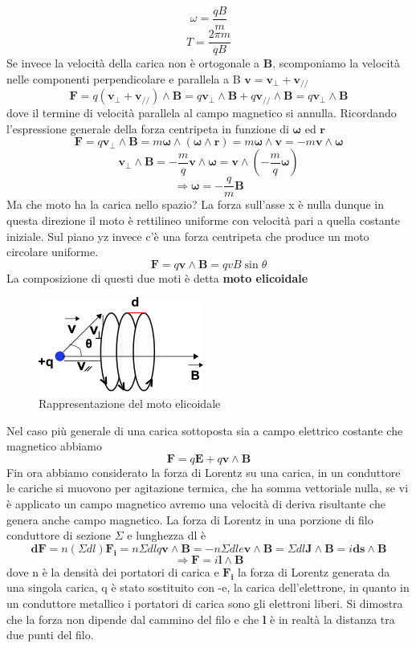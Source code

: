 \documentclass[10pt,a4paper]{article}
\begin{document}
\[\omega=\frac{qB}{m}\]
\[T=\frac{2\pi m }{qB}\]
Se invece la velocità della carica non è ortogonale a $\mathbf{B}$, scomponiamo la velocità nelle componenti perpendicolare e parallela a B \(\mathbf{v}=\mathbf{v_{\perp}}+\mathbf{v_{//}}\)
\[\mathbf{F} = q(\mathbf{v_{\perp}}+\mathbf{v_{//}})\wedge \mathbf{B}=q\mathbf{v_{\perp}}\wedge \mathbf{B}+q\mathbf{v_{//}}\wedge \mathbf{B}= q\mathbf{v_{\perp}}\wedge \mathbf{B} \] 
dove il termine di velocità parallela al campo magnetico si annulla. Ricordando l'espressione generale della forza centripeta in funzione di $\mathbf{\omega}$ ed $\mathbf{r}$
\[\mathbf{F}= q\mathbf{v_{\perp}}\wedge \mathbf{B}= m \mathbf{\omega}\wedge(\mathbf{\omega}\wedge\mathbf{r})= m\mathbf{\omega}\wedge\mathbf{v}= -m\mathbf{v}\wedge\mathbf{\omega} \] 
\[\mathbf{v_{\perp}}\wedge \mathbf{B}= -\frac{m}{q}\mathbf{v}\wedge\mathbf{\omega} =\mathbf{v}\wedge\left(-\frac{m}{q}\mathbf{\omega}\right) \]
\[\Rightarrow \mathbf{\omega}= -\frac{q}{m}\mathbf{B}\]
Ma che moto ha la carica nello spazio? La forza sull'asse x è nulla dunque in questa direzione il moto è rettilineo uniforme con velocità pari a quella costante iniziale. Sul piano yz invece c'è una forza centripeta che produce un moto circolare uniforme.
\[\mathbf{F}= q\mathbf{v}\wedge\mathbf{B}= qvB\sin\theta\]
La composizione di questi due moti è detta \textbf{moto elicoidale}
\begin{figure}[h!]
	\centering
	\includegraphics[width=0.5\linewidth]{images/moto_elicoidale}
	\caption{Rappresentazione del moto elicoidale}
	\label{fig:motoelicoidale}
\end{figure}
\FloatBarrier
Nel caso più generale di una carica sottoposta sia a campo elettrico costante che magnetico abbiamo
\[\mathbf{F}= q\mathbf{E}+q\mathbf{v}\wedge\mathbf{B}\]
Fin ora abbiamo considerato la forza di Lorentz su una carica, in un conduttore le cariche si muovono per agitazione termica, che ha somma vettoriale nulla, se vi è applicato un campo magnetico avremo una velocità di deriva risultante che genera anche campo magnetico. La forza di Lorentz in una porzione di filo conduttore di sezione $\Sigma$ e lunghezza dl è
\[\mathbf{dF}=n(\Sigma dl)\mathbf{F_i} = n\Sigma dl q\mathbf{v}\wedge\mathbf{B}= -n\Sigma dl e\mathbf{v}\wedge\mathbf{B} = \Sigma dl \mathbf{J}\wedge\mathbf{B}= i\mathbf{ds}\wedge\mathbf{B}\]  
\[\Rightarrow \mathbf{F}=i\mathbf{l}\wedge\mathbf{B}\]
dove n è la densità dei portatori di carica e \(\mathbf{F_i}\) la forza di Lorentz generata da una singola carica, q è stato sostituito con -e, la carica dell'elettrone, in quanto in un conduttore metallico i portatori di carica sono gli elettroni liberi. Si dimostra che la forza non dipende dal cammino del filo e che $\mathbf{l}$ è in realtà la distanza tra due punti del filo.  
\end{document}
